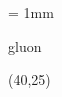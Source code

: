 \documentclass{article}
\begin{document}
	    \unitlength = 1mm
	    \begin{fmffile}{gluon}
	        \begin{fmfgraph}(40,25)
	        \end{fmfgraph}
	    \end{fmffile}
	
\end{document}
